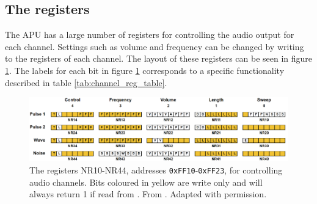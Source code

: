 \subsection{The registers}
    The APU has a large number of registers for controlling the audio output for each channel. Settings such as volume and frequency can be changed by writing to the registers of each channel. The layout of these registers can be seen in figure \ref{fig:apu_channel_registers}. The labels for each bit in figure \ref{fig:apu_channel_registers} corresponds to a specific functionality described in table \ref{tab:channel_reg_table}.

    \begin{figure}[H]
        \centering
        \includegraphics[width=\linewidth]{figures/APU/apu_channel_registers.png}
        \caption{The registers NR10-NR44, addresses \texttt{0xFF10}-\texttt{0xFF23}, for controlling audio channels. Bits coloured in yellow are write only and will always return 1 if read from \cite{AudioHardware}. From \cite{ultimateGBtalkSlides}. Adapted with permission. }
        \label{fig:apu_channel_registers}
    \end{figure}
    

